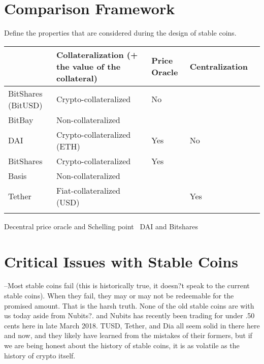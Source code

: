 \section{Comparison Framework} %
Define the properties that are considered during the design of stable coins.
~
\begin{table}[]
	\begin{tabular}{|l|l|l|l|l|}
		\hline
		& Collateralization (+ the value of the collateral) & Price Oracle & Centralization  \\ \hline
		BitShares (BitUSD) &  Crypto-collateralized &  No & \\ \hline
		BitBay & Non-collateralized & &  \\ \hline
		 DAI& Crypto-collateralized (ETH)  &  Yes& No \\ \hline
		 BitShares&Crypto-collateralized&Yes&\\ \hline
		 Basis&Non-collateralized&& \\ \hline
		 Tether & Fiat-collateralized (USD) & & Yes \\ \hline
		  &&& \\ \hline
	\end{tabular}
\end{table}

Decentral price oracle and Schelling point~\cite{cryptoinsider}
DAI and Bitshares~\cite{cryptoinsider}

\section{Critical Issues with Stable Coins}

--Most stable coins fail (this is historically true, it doesn?t speak to the current stable coins). When they fail, they may or may not be redeemable for the promised amount. That is the harsh truth. None of the old stable coins are with us today aside from Nubits?. and Nubits has recently been trading for under .50 cents here in late March 2018. TUSD, Tether, and Dia all seem solid in there here and now, and they likely have learned from the mistakes of their formers, but if we are being honest about the history of stable coins, it is as volatile as the history of crypto itself.

